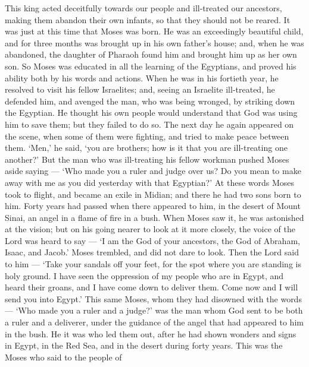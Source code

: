 This king acted deceitfully towards our people and
ill-treated our ancestors, making them abandon their own infants, so
that they should not be reared.  It was just at this time
that Moses was born. He was an exceedingly beautiful child, and for
three months was brought up in his own father's house; 
and, when he was abandoned, the daughter of Pharaoh found him and
brought him up as her own son.  So Moses was educated in
all the learning of the Egyptians, and proved his ability both by his
words and actions.  When he was in his fortieth year, he
resolved to visit his fellow Israelites;  and, seeing an
Israelite ill-treated, he defended him, and avenged the man, who was
being wronged, by striking down the Egyptian.  He thought
his own people would understand that God was using him to save them; but
they failed to do so.  The next day he again appeared on
the scene, when some of them were fighting, and tried to make peace
between them. `Men,' he said, `you are brothers; how is it that you are
ill-treating one another?'  But the man who was
ill-treating his fellow workman pushed Moses aside saying --- `Who made
you a ruler and judge over us?  Do you mean to make away
with me as you did yesterday with that Egyptian?'  At these
words Moses took to flight, and became an exile in Midian; and there he
had two sons born to him.  Forty years had passed when
there appeared to him, in the desert of Mount Sinai, an angel in a flame
of fire in a bush.  When Moses saw it, he was astonished at
the vision; but on his going nearer to look at it more closely, the
voice of the Lord was heard to say ---  `I am the God of
your ancestors, the God of Abraham, Isaac, and Jacob.' Moses trembled,
and did not dare to look.  Then the Lord said to him ---
`Take your sandals off your feet, for the spot where you are standing is
holy ground.  I have seen the oppression of my people who
are in Egypt, and heard their groans, and I have come down to deliver
them. Come now and I will send you into Egypt.'  This same
Moses, whom they had disowned with the words --- `Who made you a ruler
and a judge?' was the man whom God sent to be both a ruler and a
deliverer, under the guidance of the angel that had appeared to him in
the bush.  He it was who led them out, after he had shown
wonders and signs in Egypt, in the Red Sea, and in the desert during
forty years.  This was the Moses who said to the people of
